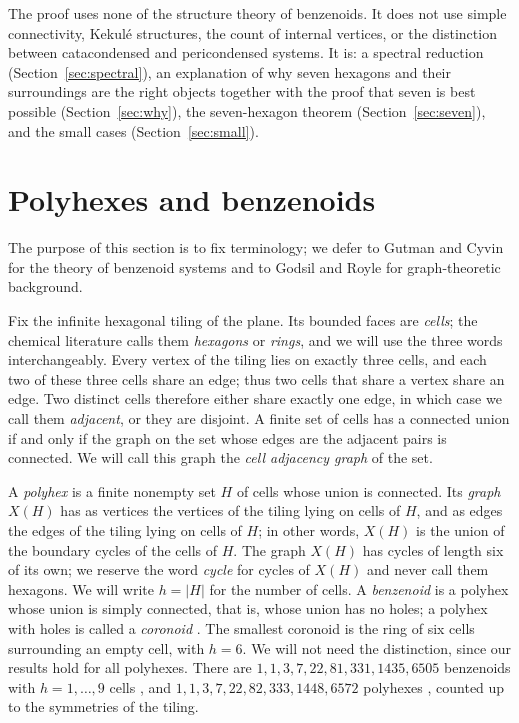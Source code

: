 \documentclass[11pt]{article}
\newcommand\abs[1]{\lvert #1\rvert}
\theoremstyle{definition}
\begin{document}
The proof uses none of the structure theory of benzenoids.  It does not use
simple connectivity, Kekul\'e structures, the count of internal vertices, or
the distinction between catacondensed and pericondensed systems.  It is: a
spectral reduction (Section~\ref{sec:spectral}), an explanation of why seven
hexagons and their surroundings are the right objects together with the proof
that seven is best possible (Section~\ref{sec:why}), the seven-hexagon theorem
(Section~\ref{sec:seven}), and the small cases
(Section~\ref{sec:small}).

\section{Polyhexes and benzenoids}\label{sec:polyhexes}

The purpose of this section is to fix terminology; we defer to
Gutman and Cyvin \cite{GutCyv1989} for the theory of benzenoid systems and
to Godsil and Royle \cite{GodRoy2001} for graph-theoretic background.

Fix the infinite hexagonal tiling of the plane.  Its bounded faces are
\textsl{cells}; the chemical literature calls them \textsl{hexagons} or
\textsl{rings}, and we will use the three words interchangeably.  Every
vertex of the tiling lies on exactly three cells, and each two of these three
cells share an edge; thus two cells that share a vertex share an edge.  Two
distinct cells therefore either share exactly one edge, in which case we call
them \textsl{adjacent}, or they are disjoint.  A finite set of cells has a
connected union if and only if the graph on the set whose edges are the
adjacent pairs is connected.  We will call this graph the \textsl{cell
adjacency graph} of the set.

A \textsl{polyhex} is a finite nonempty set $H$ of cells whose union is
connected.  Its \textsl{graph} $X(H)$ has as vertices the vertices of the
tiling lying on cells of $H$, and as edges the edges of the tiling lying on
cells of $H$; in other words, $X(H)$ is the union of the boundary cycles of
the cells of $H$.  The graph $X(H)$ has cycles of length six of its own; we
reserve the word \textsl{cycle} for cycles of $X(H)$ and never call them
hexagons.  We will write $h=\abs H$ for the number of cells.  A
\textsl{benzenoid} is a polyhex whose union is simply connected, that is,
whose union has no holes; a polyhex with holes is called a
\textsl{coronoid} \cite{CyvBruCyv1991}.  The smallest coronoid is the ring of
six cells surrounding an empty cell, with $h=6$.  We will not need the
distinction, since our results hold for all polyhexes.  There are
$1,1,3,7,22,81,331,1435,6505$ benzenoids with $h=1,\ldots,9$ cells
\cite{BriCapHan2002}, and $1,1,3,7,22,82,333,1448,6572$ polyhexes
\cite{OEIS}, counted up to the symmetries of the tiling.
\end{document}
